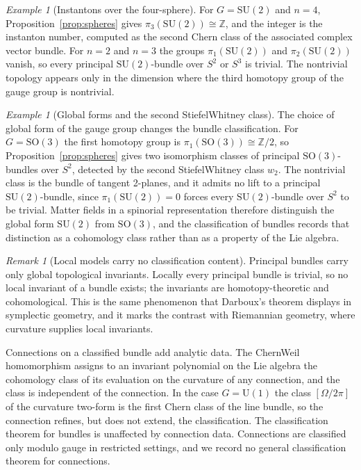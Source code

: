\documentclass[11pt,letterpaper]{article}
\theoremstyle{definition}
\theoremstyle{remark}
\newtheorem{remark}[theorem]{Remark}
\newtheorem{example}[theorem]{Example}
\begin{document}
\begin{example}[Instantons over the four-sphere]
\label{ex:instanton}
For $G = \mathrm{SU}(2)$ and $n = 4$, Proposition~\ref{prop:spheres} gives $\pi_3(\mathrm{SU}(2)) \cong \mathbb{Z}$, and the integer is the instanton number, computed as the second Chern class of the associated complex vector bundle. For $n = 2$ and $n = 3$ the groups $\pi_1(\mathrm{SU}(2))$ and $\pi_2(\mathrm{SU}(2))$ vanish, so every principal $\mathrm{SU}(2)$-bundle over $S^2$ or $S^3$ is trivial. The nontrivial topology appears only in the dimension where the third homotopy group of the gauge group is nontrivial.
\end{example}

\begin{example}[Global forms and the second Stiefel\textendash{}Whitney class]
\label{ex:global-form}
The choice of global form of the gauge group changes the bundle classification. For $G = \mathrm{SO}(3)$ the first homotopy group is $\pi_1(\mathrm{SO}(3)) \cong \mathbb{Z}/2$, so Proposition~\ref{prop:spheres} gives two isomorphism classes of principal $\mathrm{SO}(3)$-bundles over $S^2$, detected by the second Stiefel\textendash{}Whitney class $w_2$. The nontrivial class is the bundle of tangent 2-planes, and it admits no lift to a principal $\mathrm{SU}(2)$-bundle, since $\pi_1(\mathrm{SU}(2)) = 0$ forces every $\mathrm{SU}(2)$-bundle over $S^2$ to be trivial. Matter fields in a spinorial representation therefore distinguish the global form $\mathrm{SU}(2)$ from $\mathrm{SO}(3)$, and the classification of bundles records that distinction as a cohomology class rather than as a property of the Lie algebra.
\end{example}

\begin{remark}[Local models carry no classification content]
\label{rem:local}
Principal bundles carry only global topological invariants. Locally every principal bundle is trivial, so no local invariant of a bundle exists; the invariants are homotopy-theoretic and cohomological. This is the same phenomenon that Darboux's theorem displays in symplectic geometry, and it marks the contrast with Riemannian geometry, where curvature supplies local invariants.
\end{remark}

Connections on a classified bundle add analytic data. The Chern\textendash{}Weil homomorphism assigns to an invariant polynomial on the Lie algebra the cohomology class of its evaluation on the curvature of any connection, and the class is independent of the connection. In the case $G = \mathrm{U}(1)$ the class $[\Omega/2\pi]$ of the curvature two-form is the first Chern class of the line bundle, so the connection refines, but does not extend, the classification. The classification theorem for bundles is unaffected by connection data. Connections are classified only modulo gauge in restricted settings, and we record no general classification theorem for connections.
\end{document}
